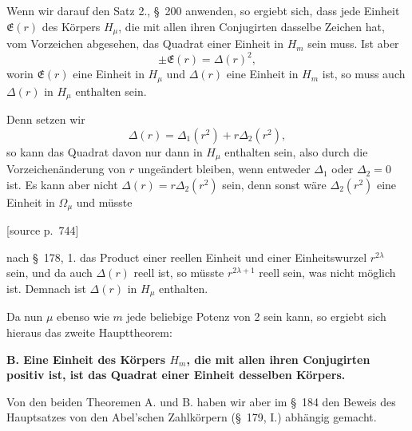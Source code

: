 \documentclass[11pt]{article}
\newcommand{\srcpage}[1]{\par\medskip\noindent\textsf{[source p.~#1]}\par\smallskip}
\begin{document}
Wenn wir darauf den Satz 2., \S~200 anwenden, so ergiebt sich, dass jede Einheit $\mathfrak E(r)$ des Körpers $H_\mu$, die mit allen ihren Conjugirten dasselbe Zeichen hat, vom Vorzeichen abgesehen, das Quadrat einer Einheit in $H_m$ sein muss. Ist aber
\[
\pm\mathfrak E(r)=\Delta(r)^2,
\]
worin $\mathfrak E(r)$ eine Einheit in $H_\mu$ und $\Delta(r)$ eine Einheit in $H_m$ ist, so muss auch $\Delta(r)$ in $H_\mu$ enthalten sein.

Denn setzen wir
\[
\Delta(r)=\Delta_1(r^2)+r\Delta_2(r^2),
\]
so kann das Quadrat davon nur dann in $H_\mu$ enthalten sein, also durch die Vorzeichenänderung von $r$ ungeändert bleiben, wenn entweder $\Delta_1$ oder $\Delta_2=0$ ist. Es kann aber nicht $\Delta(r)=r\Delta_2(r^2)$ sein, denn sonst wäre $\Delta_2(r^2)$ eine Einheit in $\Omega_\mu$ und müsste
\srcpage{744}
nach \S~178, 1. das Product einer reellen Einheit und einer Einheitswurzel $r^{2\lambda}$ sein, und da auch $\Delta(r)$ reell ist, so müsste $r^{2\lambda+1}$ reell sein, was nicht möglich ist. Demnach ist $\Delta(r)$ in $H_\mu$ enthalten.

Da nun $\mu$ ebenso wie $m$ jede beliebige Potenz von 2 sein kann, so ergiebt sich hieraus das zweite Haupttheorem:

\begin{center}\textbf{B. Eine Einheit des Körpers $H_m$, die mit allen ihren Conjugirten positiv ist, ist das Quadrat einer Einheit desselben Körpers.}\end{center}

Von den beiden Theoremen A. und B. haben wir aber im \S~184 den Beweis des Hauptsatzes von den Abel'schen Zahlkörpern (\S~179, I.) abhängig gemacht.
\end{document}
